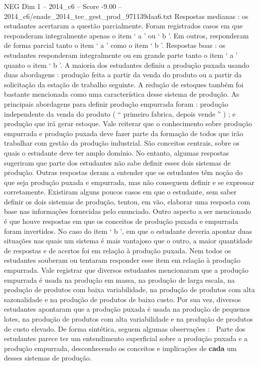 \begin{textsample}{NEG Dim 1 – 2014\_c6 – Score -9.00 – 2014\_c6/enade\_2014\_tec\_gest\_prod\_971139daa6.txt}
Respostas medianas : os estudantes acertaram a questão parcialmente.
Foram registrados casos em que responderam integralmente apenas o item ‘ a ’ ou ‘ b ’.
Em outros, responderam de forma parcial tanto o item ‘ a ’ como o item ‘ b ’.
Respostas boas : os estudantes responderam integralmente ou em grande parte tanto o item ‘ a ’ quanto o item ‘ b ’.
A maioria dos estudantes definiu a produção puxada usando duas abordagens : produção feita a partir da venda do produto ou a partir da solicitação da estação de trabalho seguinte.
A redução de estoques também foi bastante mencionada como uma característica desse sistema de produção.
As principais abordagens para definir produção empurrada foram : produção independente da venda do produto ( “ primeiro fabrica, depois vende ” ) ; e produção que irá gerar estoque.
Vale reiterar que o conhecimento sobre produção empurrada e produção puxada deve fazer parte da formação de todos que irão trabalhar com gestão da produção industrial.
São conceitos centrais, sobre os quais o estudante deve ter amplo domínio.
No entanto, algumas respostas sugeriram que parte dos estudantes não sabe definir esses dois sistemas de produção.
Outras respostas deram a entender que os estudantes têm noção do que seja produção puxada e empurrada, mas não conseguem definir e se expressar corretamente.
Existiram alguns poucos casos em que o estudante, sem saber definir os dois sistemas de produção, tentou, em vão, elaborar uma resposta com base nas informações fornecidas pelo enunciado.
Outro aspecto a ser mencionado é que houve respostas em que os conceitos de produção puxada e empurrada foram invertidos.
No caso do item ‘ b ’, em que o estudante deveria apontar duas situações nas quais um sistema é mais vantajoso que o outro, a maior quantidade de respostas e de acertos foi em relação à produção puxada.
Nem todos os estudantes souberam ou tentaram responder esse item em relação à produção empurrada.
Vale registrar que diversos estudantes mencionaram que a produção empurrada é usada na produção em massa, na produção de larga escala, na produção de produtos com baixa variabilidade, na produção de produtos com alta sazonalidade e na produção de produtos de baixo custo.
Por sua vez, diversos estudantes apontaram que a produção puxada é usada na produção de pequenos lotes, na produção de produtos com alta variabilidade e na produção de produtos de custo elevado.
De forma sintética, seguem algumas observações :  Parte dos estudantes parece ter um entendimento superficial sobre a produção puxada e a produção empurrada, desconhecendo os conceitos e implicações de \textbf{cada} um desses sistemas de produção.

\end{textsample}
